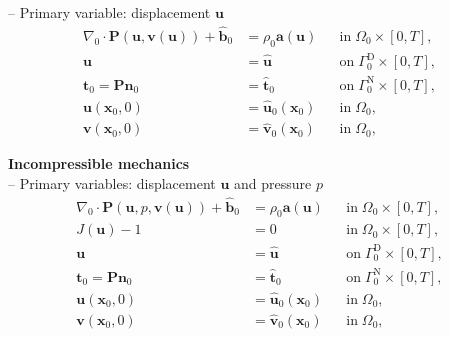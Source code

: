\documentclass[a4paper,12pt]{report}
\newcommand{\Om}{\mathit{\Omega}}
\newcommand{\Gm}{\mathit{\Gamma}}
\begin{document}
-- Primary variable: displacement $\boldsymbol{u}$
\begin{equation}
\label{equation-solid-strong-form}
\begin{aligned}
\nabla_{0} \cdot \boldsymbol{P}(\boldsymbol{u},\boldsymbol{v}(\boldsymbol{u})) + \hat{\boldsymbol{b}}_{0} &= \rho_{0} \boldsymbol{a}(\boldsymbol{u}) &&\text{in} \; \mathit{\Omega}_{0} \times [0, T], \\
\boldsymbol{u} &= \hat{\boldsymbol{u}} &&\text{on} \; \mathit{\Gamma}_{0}^{\mathrm{D}} \times [0, T],\\
\boldsymbol{t}_{0} = \boldsymbol{P}\boldsymbol{n}_{0} &= \hat{\boldsymbol{t}}_{0} &&\text{on} \; \mathit{\Gamma}_{0}^{\mathrm{N}} \times [0, T],\\
\boldsymbol{u}(\boldsymbol{x}_{0},0) &= \hat{\boldsymbol{u}}_{0}(\boldsymbol{x}_{0}) &&\text{in} \; \mathit{\Omega}_{0},\\
\boldsymbol{v}(\boldsymbol{x}_{0},0) &= \hat{\boldsymbol{v}}_{0}(\boldsymbol{x}_{0}) &&\text{in} \; \mathit{\Omega}_{0},
\end{aligned}
\end{equation}

\textbf{Incompressible mechanics}\\

-- Primary variables: displacement $\boldsymbol{u}$ and pressure $p$
\begin{equation}
\label{equation-solid-strong-form-inc}
\begin{aligned}
\nabla_{0} \cdot \boldsymbol{P}(\boldsymbol{u},p,\boldsymbol{v}(\boldsymbol{u})) + \hat{\boldsymbol{b}}_{0} &= \rho_{0} \boldsymbol{a}(\boldsymbol{u}) &&\text{in} \; \mathit{\Omega}_{0} \times [0, T], \\
J(\boldsymbol{u})-1 &= 0 &&\text{in} \; \mathit{\Omega}_{0} \times [0, T], \\
\boldsymbol{u} &= \hat{\boldsymbol{u}} &&\text{on} \; \mathit{\Gamma}_{0}^{\mathrm{D}} \times [0, T],\\
\boldsymbol{t}_{0} = \boldsymbol{P}\boldsymbol{n}_{0} &= \hat{\boldsymbol{t}}_{0} &&\text{on} \; \mathit{\Gm}_{0}^{\mathrm{N}} \times [0, T],\\
\boldsymbol{u}(\boldsymbol{x}_{0},0) &= \hat{\boldsymbol{u}}_{0}(\boldsymbol{x}_{0}) &&\text{in} \; \mathit{\Om}_{0},\\
\boldsymbol{v}(\boldsymbol{x}_{0},0) &= \hat{\boldsymbol{v}}_{0}(\boldsymbol{x}_{0}) &&\text{in} \; \mathit{\Om}_{0},
\end{aligned}
\end{equation}
\end{document}
